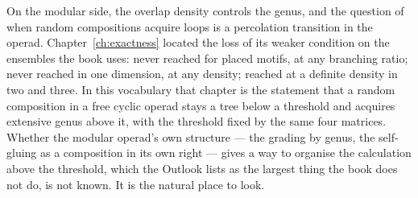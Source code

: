 On the modular side, the overlap density controls the genus, and the
question of when random compositions acquire loops is a percolation
transition in the operad. Chapter~\ref{ch:exactness} located the loss of
its weaker condition on the ensembles the book uses: never reached for placed motifs, at any branching
ratio; never reached in one dimension, at any density; reached at a
definite density in two and three. In this vocabulary
that chapter is the statement that a random composition in a free cyclic
operad stays a tree below a threshold and acquires extensive genus above it,
with the threshold fixed by the same four matrices. Whether the modular
operad's own structure --- the grading by genus, the self-gluing as a
composition in its own right --- gives a way to organise the calculation
above the threshold, which the Outlook lists as the largest thing the book
does not do, is not known. It is the natural place to look.
